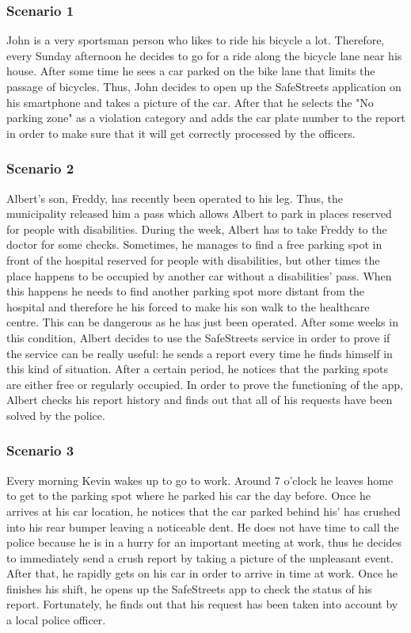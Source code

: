 \subsubsection{Scenario 1}
John is a very sportsman person who likes to ride his bicycle a lot. Therefore, every Sunday afternoon he decides to go for a ride along the bicycle lane near his house. After some time he sees a car parked on the bike lane that limits the passage of bicycles. Thus, John decides to open up the SafeStreets application on his smartphone and takes a picture of the car. After that he selects the "No parking zone" as a violation category and adds the car plate number to the report in order to make sure that it will get correctly processed by the officers. 

\subsubsection{Scenario 2}
Albert's son, Freddy, has recently been operated to his leg. Thus, the municipality released him a pass which allows Albert to park in places reserved for people with disabilities. During the week, Albert has to take Freddy to the doctor for some checks. Sometimes, he manages to find a free parking spot in front of the hospital reserved for people with disabilities, but other times the place happens to be occupied by another car without a disabilities' pass. When this happens he needs to find another parking spot more distant from the hospital and therefore he his forced to make his son walk to the healthcare centre. This can be dangerous as he has just been operated. After some weeks in this condition, Albert decides to use the SafeStreets service in order to prove if the service can be really useful: he sends a report every time he finds himself in this kind of situation. After a certain period, he notices that the parking spots are either free or regularly occupied. In order to prove the functioning of the app, Albert checks his report history and finds out that all of his requests have been solved by the police.

\subsubsection{Scenario 3}
Every morning Kevin wakes up to go to work. Around 7 o'clock he leaves home to get to the parking spot where he parked his car the day before. Once he arrives at his car location, he notices that the car parked behind his' has crushed into his rear bumper leaving a noticeable dent. He does not have time to call the police because he is in a hurry for an important meeting at work, thus he decides to immediately send a crush report by taking a picture of the unpleasant event. After that, he rapidly gets on his car in order to arrive in time at work. Once he finishes his shift, he opens up the SafeStreets app to check the status of his report. Fortunately, he finds out that his request has been taken into account by a local police officer.

